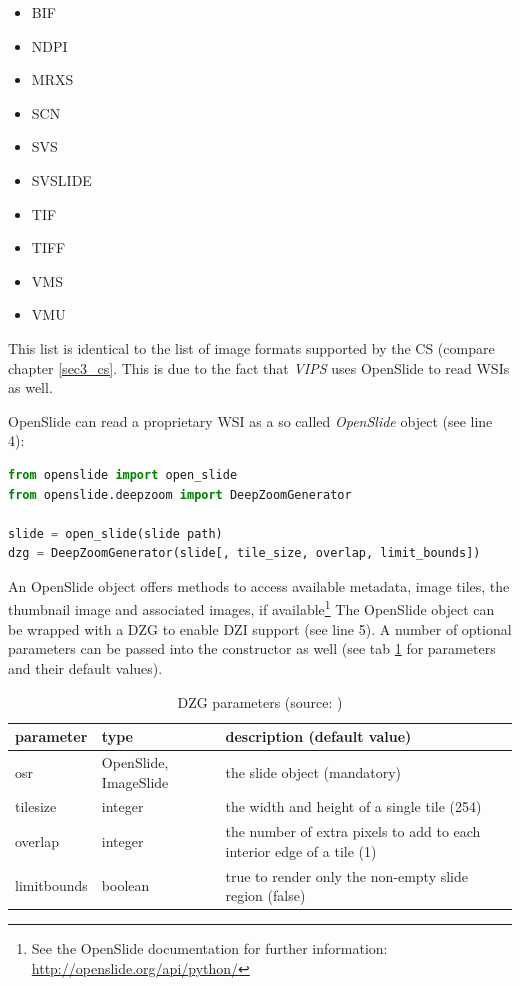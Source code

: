 \begin{itemize}
	\item BIF
	\item NDPI
	\item MRXS
	\item SCN
	\item SVS
	\item SVSLIDE
	\item TIF
	\item TIFF
	\item VMS
	\item VMU
\end{itemize}

This list is identical to the list of image formats supported by the CS (compare chapter \ref{sec3_cs}. This is due to the fact that \emph{VIPS} uses OpenSlide to read WSIs as well\cite{web:vips}.

OpenSlide can read a proprietary WSI as a so called \emph{OpenSlide} object (see line 4):

\begin{lstlisting}[language=python, frame=single]
from openslide import open_slide
from openslide.deepzoom import DeepZoomGenerator

slide = open_slide(slide path)
dzg = DeepZoomGenerator(slide[, tile_size, overlap, limit_bounds])
\end{lstlisting}

An OpenSlide object offers methods to access available metadata, image tiles, the thumbnail image and associated images, if available\footnote{
	See the OpenSlide documentation for further information: \url{http://openslide.org/api/python/}
} The OpenSlide object can be wrapped with a DZG to enable DZI support (see line 5)\cite{web:openslide}. A number of optional parameters can be passed into the constructor as well (see tab \ref{tab4_DZGparam} for parameters and their default values).

\begin{table}[H]
	\begin{center}
		\begin{tabular}{| p{2.5cm} | p{2cm} | p{5.5cm} |}
			\hline
			\textbf{parameter} & \textbf{type} & \textbf{description (default value)}\\ \hline
			osr & OpenSlide, ImageSlide & the slide object (mandatory)
			\\ \hline
			tile{\textunderscore}size & integer & the width and height of a single tile (254)\\ \hline
			overlap & integer & the number of extra pixels to add to each interior edge of a tile (1)\\ \hline
			limit{\textunderscore}bounds & boolean & true to render only the non-empty slide region (false)\\ \hline
		\end{tabular}
		\caption{DZG parameters (source: \cite{web:openslide})}
		\label{tab4_DZGparam}
	\end{center}
\end{table}

